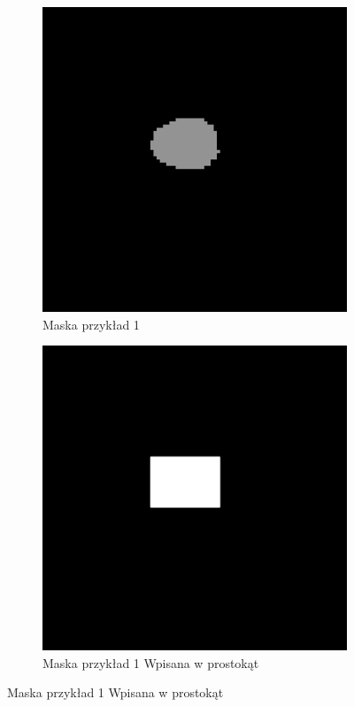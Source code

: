 \documentclass[a4paper,11pt,twoside]{report}
\theoremstyle{definition}
\begin{document}
\begin{figure}[htb]
	\centering %
	\begin{subfigure}{0.25\textwidth}
		\includegraphics[width=\linewidth]{Mask/1/maska.png}
		\caption{Maska przykład 1}
		\label{fig:1}
	\end{subfigure}\hfil %
	\begin{subfigure}{0.25\textwidth}
		\includegraphics[width=\linewidth]{Mask/1/square.png}
		\caption{Maska przykład 1 Wpisana w prostokąt}
		\label{fig:2}
	\end{subfigure}\hfil %
	

\end{figure}
\end{document}
